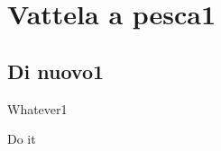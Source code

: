\section{Vattela a pesca1}

\subsection{ Di nuovo1}

\begin{frame}[fragile]{Whatever1}

  Do it 

\end{frame}
